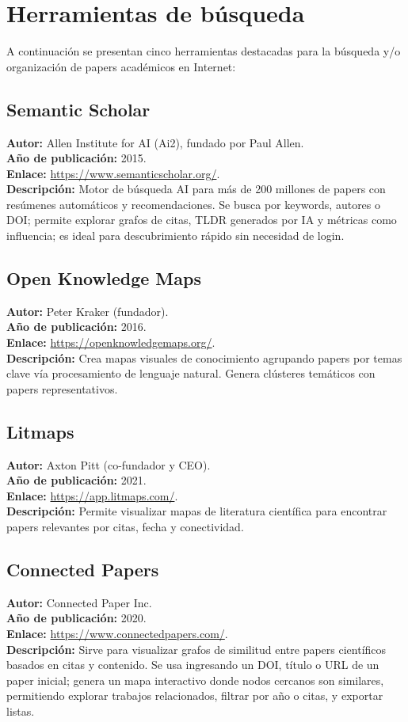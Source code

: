 \section{Herramientas de búsqueda}
A continuación se presentan cinco herramientas destacadas para la búsqueda y/o organización de papers académicos en Internet:\\

\subsection{Semantic Scholar}
\textbf{Autor:} Allen Institute for AI (Ai2), fundado por Paul Allen.\\
\textbf{Año de publicación:} 2015.\\
\textbf{Enlace:} \url{https://www.semanticscholar.org/}.\\
\textbf{Descripción:} Motor de búsqueda AI para más de 200 millones de papers con resúmenes automáticos y recomendaciones. Se busca por keywords, autores o DOI; permite explorar grafos de citas, TLDR generados por IA y métricas como influencia; es ideal para descubrimiento rápido sin necesidad de login.
\subsection{Open Knowledge Maps}
\textbf{Autor:} Peter Kraker (fundador).\\
\textbf{Año de publicación:} 2016.\\
\textbf{Enlace:} \url{https://openknowledgemaps.org/}.\\
\textbf{Descripción:} Crea mapas visuales de conocimiento agrupando papers por temas clave vía procesamiento de lenguaje natural. Genera clústeres temáticos con papers representativos.
\subsection{Litmaps}
\textbf{Autor:} Axton Pitt (co-fundador y CEO).\\
\textbf{Año de publicación:} 2021.\\
\textbf{Enlace:} \url{https://app.litmaps.com/}.\\
\textbf{Descripción:} Permite visualizar mapas de literatura científica para encontrar papers relevantes por citas, fecha y conectividad.
\subsection{Connected Papers}
\textbf{Autor:} Connected Paper Inc.\\
\textbf{Año de publicación:} 2020.\\
\textbf{Enlace:} \url{https://www.connectedpapers.com/}.\\
\textbf{Descripción:} Sirve para visualizar grafos de similitud entre papers científicos basados en citas y contenido. Se usa ingresando un DOI, título o URL de un paper inicial; genera un mapa interactivo donde nodos cercanos son similares, permitiendo explorar trabajos relacionados, filtrar por año o citas, y exportar listas.
